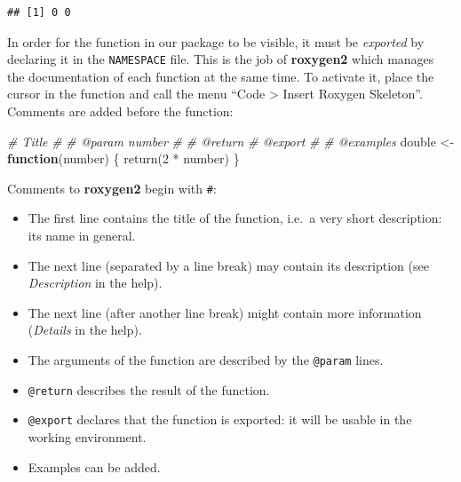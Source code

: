 \documentclass[
  12pt,
  american,
  a4paper,
  extrafontsizes,onecolumn,openright
  ]{memoir}
\newenvironment{Shaded}{\begin{snugshade}}{\end{snugshade}}
\newcommand{\CommentTok}[1]{\textcolor[rgb]{0.56,0.35,0.01}{\textit{#1}}}
\newcommand{\ControlFlowTok}[1]{\textcolor[rgb]{0.13,0.29,0.53}{\textbf{#1}}}
\newcommand{\DecValTok}[1]{\textcolor[rgb]{0.00,0.00,0.81}{#1}}
\newcommand{\FunctionTok}[1]{\textcolor[rgb]{0.00,0.00,0.00}{#1}}
\newcommand{\NormalTok}[1]{#1}
\newcommand{\OtherTok}[1]{\textcolor[rgb]{0.56,0.35,0.01}{#1}}
\newcommand{\SpecialCharTok}[1]{\textcolor[rgb]{0.00,0.00,0.00}{#1}}
\providecommand{\tightlist}{%
  \setlength{\itemsep}{0pt}\setlength{\parskip}{0pt}}
\begin{document}
\begin{verbatim}
## [1] 0 0
\end{verbatim}

\normalsize

In order for the function in our package to be visible, it must be \emph{exported} by declaring it in the \texttt{NAMESPACE} file.
This is the job of \textbf{roxygen2} which manages the documentation of each function at the same time.
To activate it, place the cursor in the function and call the menu \enquote{Code \textgreater{} Insert Roxygen Skeleton}.
Comments are added before the function:

\scriptsize

\begin{Shaded}
\begin{Highlighting}[]
\CommentTok{\#\textquotesingle{} Title}
\CommentTok{\#\textquotesingle{}}
\CommentTok{\#\textquotesingle{} @param number }
\CommentTok{\#\textquotesingle{}}
\CommentTok{\#\textquotesingle{} @return}
\CommentTok{\#\textquotesingle{} @export}
\CommentTok{\#\textquotesingle{}}
\CommentTok{\#\textquotesingle{} @examples}
\NormalTok{double }\OtherTok{\textless{}{-}} \ControlFlowTok{function}\NormalTok{(number) \{}
    \FunctionTok{return}\NormalTok{(}\DecValTok{2} \SpecialCharTok{*}\NormalTok{ number)}
\NormalTok{\}}
\end{Highlighting}
\end{Shaded}

\normalsize

Comments to \textbf{roxygen2} begin with \texttt{\#\textquotesingle{}}:

\begin{itemize}
\tightlist
\item
  The first line contains the title of the function, i.e.~a very short description: its name in general.
\item
  The next line (separated by a line break) may contain its description (see \emph{Description} in the help).
\item
  The next line (after another line break) might contain more information (\emph{Details} in the help).
\item
  The arguments of the function are described by the \texttt{@param} lines.
\item
  \texttt{@return} describes the result of the function.
\item
  \texttt{@export} declares that the function is exported: it will be usable in the working environment.
\item
  Examples can be added.
\end{itemize}
\end{document}
